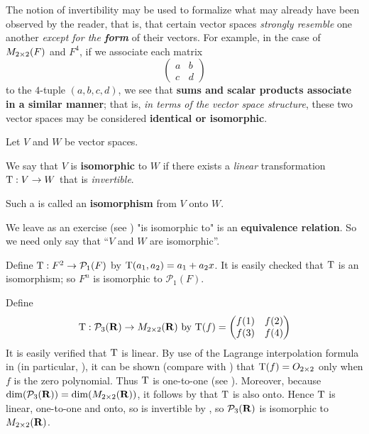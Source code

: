 \begin{remark} \label{remark 2.4.2}
The notion of invertibility may be used to formalize what may already have been observed by the reader, that is,
that certain vector spaces \emph{strongly resemble} one another \emph{except for the \textbf{form}} of their vectors.
For example, in the case of \(M_{2 \times 2}(F)\) and \(F^4\), if we associate each matrix
\[
    \begin{pmatrix} a & b \\ c & d \end{pmatrix}
\]
to the \(4\)-tuple \((a, b, c, d)\), we see that \textbf{sums and scalar products associate in a similar manner};
that is, \emph{in terms of the vector space structure}, these two
vector spaces may be considered \textbf{identical or isomorphic}.
\end{remark}

\begin{definition} \label{def 2.14}
Let \(V\) and \(W\) be vector spaces.

 We say that \(V\) is \textbf{isomorphic} to \(W\) if there exists a \emph{linear} transformation \(\mathrm{T} : V \to W\) that is \emph{invertible}.

 Such a \LTRAN{} is called an \textbf{isomorphism} from \(V\) onto \(W\).
\end{definition}

\begin{remark} \label{remark 2.4.3}
We leave as an exercise (see ) "is isomorphic to" is an \textbf{equivalence relation}.
So we need only say that ``\(V\) and \(W\) are isomorphic''.
\end{remark}

\begin{example} \label{example 2.4.4}
Define \(\mathrm{T} : F^2 \to \mathcal{P}_1(F)\) by \(\mathrm{T}(a_1, a_2) = a_1 + a_2x\).
It is easily checked that \(\mathrm{T}\) is an isomorphism;
so \(F^n\) is isomorphic to \(\mathcal{P}_1(F)\).
\end{example}

\begin{example} \label{example 2.4.5}
Define
\[
    \mathrm{T} : \mathcal{P}_3(\mathbf{R}) \to M_{2 \times 2}(\mathbf{R}) \text{ by }
    \mathrm{T}(f) = \begin{pmatrix} f(1) & f(2) \\ f(3) & f(4) \end{pmatrix}
\]
It is easily verified that \(\mathrm{T}\) is linear.
By use of the Lagrange interpolation formula in (in particular, ), it can be shown (compare with ) that \(\mathrm{T}(f) = O_{2 \times 2}\) only when \(f\) is the zero polynomial.
Thus \(\mathrm{T}\) is one-to-one (see ).
Moreover, because \(\dim(\mathcal{P}_3(\mathbf{R})) = \dim(M_{2 \times 2}(\mathbf{R}))\), it follows by  that \(\mathrm{T}\) is also onto.
Hence \(\mathrm{T}\) is linear, one-to-one and onto, so is invertible by , so \(\mathcal{P}_3(\mathbf{R})\) is isomorphic to \(M_{2 \times 2}(\mathbf{R})\).
\end{example}

